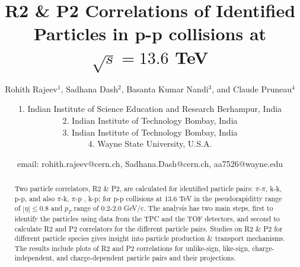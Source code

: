 \documentclass[ALICE,manyauthors]{ALICE_analysis_notes}
\begin{document}
%
%
%
\begin{titlepage}
%
\PHdate{\today}
%
\title{R2 \& P2 Correlations of Identified Particles in p-p collisions at \\$\sqrt{s}=13.6$ TeV}%
%
\author{Rohith Rajeev$^{1}$, Sadhana Dash$^2$, Basanta Kumar Nandi$^3$, and Claude Pruneau$^4$}
\author{
1. Indian Institute of Science Education and Research Berhampur, India\\
2. Indian Institute of Technology Bombay, India\\
3. Indian Institute of Technology Bombay, India\\
4. Wayne State University, U.S.A.
}
\author{email: rohith.rajeev@cern.ch, Sadhana.Dash@cern.ch, aa7526@wayne.edu}%
%
%
\linenumbers
\begin{abstract}
Two particle correlators, R2 \& P2, are calculated for identified particle pairs: $\pi$-$\pi$, k-k, p-p, and also $\pi$-k, $\pi$-p , k-p; for p-p collisions at 13.6 TeV in the pseudorapiditty range of $|\eta|\leq0.8$ and $p_T$ range of 0.2-2.0 GeV/c. The analysis has two main steps, first to identify the particles using data from the TPC and the TOF detectors, and second to calculate R2 and P2 correlators for the different particle pairs. Studies on R2 \& P2 for different particle species gives insight into particle production \& transport mechanisms. The results include plots of R2 and P2 correlations for unlike-sign, like-sign, charge-independent, and charge-dependent particle pairs and their projections.
\end{abstract}
\end{titlepage}
\linenumbers
\end{document}
